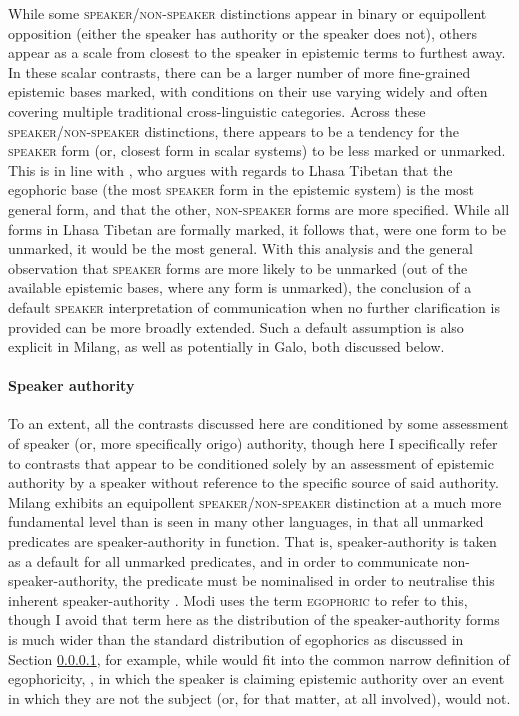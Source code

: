 While some \textsc{speaker}/\textsc{non-speaker} distinctions appear in binary or equipollent opposition (either the speaker has authority or the speaker does not), others appear as a scale from closest to the speaker in epistemic terms to furthest away. In these scalar contrasts, there can be a larger number of more fine-grained epistemic bases marked, with conditions on their use varying widely and often covering multiple traditional cross-linguistic categories. Across these \textsc{speaker}/\textsc{non-speaker} distinctions, there appears to be a tendency for the \textsc{speaker} form (or, closest form in scalar systems) to be less marked or unmarked. This is in line with , who argues with regards to Lhasa Tibetan that the egophoric base (the most \textsc{speaker} form in the epistemic system) is the most general form, and that the other, \textsc{non-speaker} forms are more specified. While all forms in Lhasa Tibetan are formally marked, it follows that, were one form to be unmarked, it would be the most general. With this analysis and the general observation that \textsc{speaker} forms are more likely to be unmarked (out of the available epistemic bases, where any form is unmarked), the conclusion of a default \textsc{speaker} interpretation of communication when no further clarification is provided can be more broadly extended. Such a default assumption is also explicit in Milang, as well as potentially in Galo, both discussed below.

\paragraph{Speaker authority}
To an extent, all the contrasts discussed here are conditioned by some assessment of speaker (or, more specifically origo) authority, though here I specifically refer to contrasts that appear to be conditioned solely by an assessment of epistemic authority by a speaker without reference to the specific source of said authority.
Milang \cite[Siangic: India,][]{Modi2017} exhibits an equipollent \textsc{speaker}/\textsc{non-speaker} distinction at a much more fundamental level than is seen in many other languages, in that all unmarked predicates are speaker-authority in function. That is, speaker-authority is taken as a default for all unmarked predicates, and in order to communicate non-speaker-authority, the predicate must be nominalised in order to neutralise this inherent speaker-authority \cite[455]{Modi2017}. Modi uses the term \textsc{egophoric} to refer to this, though I avoid that term here as the distribution of the speaker-authority forms is much wider than the standard distribution of egophorics as discussed in Section \ref{}, for example, while  would fit into the common narrow definition of egophoricity, , in which the speaker is claiming epistemic authority over an event in which they are not the subject (or, for that matter, at all involved), would not.

